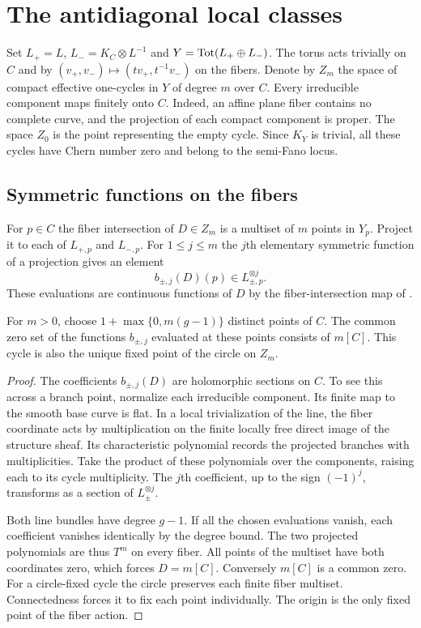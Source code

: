 \section{The antidiagonal local classes}\label{sec:local}

Set $L_+=L$, $L_-=K_C\otimes L^{-1}$ and
$Y=\operatorname{Tot}(L_+\oplus L_-)$. The torus acts trivially on $C$ and by
$(v_+,v_-)\mapsto(tv_+,t^{-1}v_-)$ on the fibers. Denote by $Z_m$
the space of compact effective one-cycles in $Y$ of degree $m$ over
$C$. Every irreducible component maps finitely onto $C$. Indeed, an
affine plane fiber contains no complete curve, and the projection
of each compact component is proper. The space $Z_0$ is the point
representing the empty cycle. Since $K_Y$ is trivial, all these
cycles have Chern number zero and belong to the semi-Fano locus.

\subsection{Symmetric functions on the fibers}
For $p\in C$ the fiber intersection of $D\in Z_m$ is a multiset of
$m$ points in $Y_p$. Project it to each of $L_{+,p}$ and $L_{-,p}$.
For $1\leq j\leq m$ the $j$th elementary symmetric function of a
projection gives an element
\[
 b_{\pm,j}(D)(p)\in L_{\pm,p}^{\otimes j}.
\]
These evaluations are continuous functions of $D$ by the
fiber-intersection map of \cite[(4.15)]{Pardon}.

\begin{lemma}\label{lem:support}
For $m>0$, choose $1+\max\{0,m(g-1)\}$ distinct points of $C$.
The common zero set of the functions $b_{\pm,j}$ evaluated at these
points consists of $m[C]$. This cycle is also the unique fixed point
of the circle on $Z_m$.
\end{lemma}
\begin{proof}
The coefficients $b_{\pm,j}(D)$ are holomorphic sections on $C$.
To see this across a branch point, normalize each irreducible
component. Its finite map to the smooth base curve is flat. In a
local trivialization of the line, the fiber coordinate acts by
multiplication on the finite locally free direct image of the
structure sheaf. Its characteristic polynomial records the projected
branches with multiplicities. Take the product of these polynomials
over the components, raising each to its cycle multiplicity. The
$j$th coefficient, up to the sign $(-1)^j$, transforms as a
section of $L_\pm^{\otimes j}$.

Both line bundles have degree $g-1$. If all the chosen evaluations
vanish, each coefficient vanishes identically by the degree bound.
The two projected polynomials are thus $T^m$ on every fiber. All
points of the multiset have both coordinates zero, which forces
$D=m[C]$. Conversely $m[C]$ is a common zero. For a circle-fixed
cycle the circle preserves each finite fiber multiset. Connectedness
forces it to fix each point individually. The origin is the only
fixed point of the fiber action.
\end{proof}

